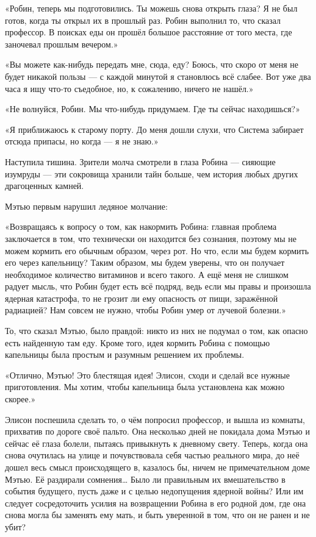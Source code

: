 \documentclass[a5paper, 9pt,
final, openany, twoside=true]{memoir}
\begin{document}
«Робин, теперь мы подготовились. Ты можешь снова открыть глаза? Я не был готов, когда ты открыл их в прошлый раз. Робин выполнил то, что сказал профессор. В поисках еды он прошёл большое расстояние от того места, где заночевал прошлым вечером.»

«Вы можете как-нибудь передать мне, сюда, еду? Боюсь, что скоро от меня не будет никакой пользы — с каждой минутой я становлюсь всё слабее. Вот уже два часа я ищу что-то съедобное, но, к сожалению, ничего не нашёл.»

«Не волнуйся, Робин. Мы что-нибудь придумаем. Где ты сейчас находишься?»

«Я приближаюсь к старому порту. До меня дошли слухи, что Система забирает отсюда припасы, но когда — я не знаю.»

Наступила тишина. Зрители молча смотрели в глаза Робина — сияющие изумруды — эти сокровища хранили тайн больше, чем история любых других драгоценных камней.

Мэтью первым нарушил ледяное молчание:

«Возвращаясь к вопросу о том, как накормить Робина: главная проблема заключается в том, что технически он находится без сознания, поэтому мы не можем кормить его обычным образом, через рот. Но что, если мы будем кормить его через капельницу? Таким образом, мы будем уверены, что он получает необходимое количество витаминов и всего такого. А ещё меня не слишком радует мысль, что Робин будет есть всё подряд, ведь если мы правы и произошла ядерная катастрофа, то не грозит ли ему опасность от пищи, заражённой радиацией? Нам совсем не нужно, чтобы Робин умер от лучевой болезни.»

То, что сказал Мэтью, было правдой: никто из них не подумал о том, как опасно есть найденную там еду. Кроме того, идея кормить Робина с помощью капельницы была простым и разумным решением их проблемы.

«Отлично, Мэтью! Это блестящая идея! Элисон, сходи и сделай все нужные приготовления. Мы хотим, чтобы капельница была установлена как можно скорее.»\bigskip

Элисон поспешила сделать то, о чём попросил профессор, и вышла из комнаты, прихватив по дороге своё пальто. Она несколько дней не покидала дома Мэтью и сейчас её глаза болели, пытаясь привыкнуть к дневному свету. Теперь, когда она снова очутилась на улице и почувствовала себя частью реального мира, до неё дошел весь смысл происходящего в, казалось бы, ничем не примечательном доме Мэтью. Её раздирали сомнения… Было ли правильным их вмешательство в события будущего, пусть даже и с целью недопущения ядерной войны? Или им следует сосредоточить усилия на возвращении Робина в его родной дом, где она снова могла бы заменять ему мать, и быть уверенной в том, что он не ранен и не убит?
\end{document}
